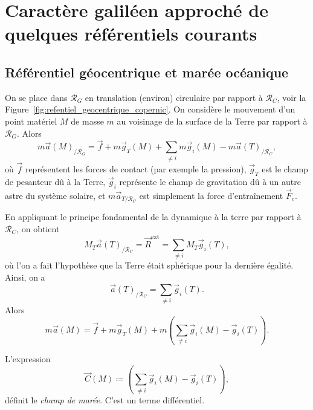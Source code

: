 \section[Caractère galiléen de certains référentiels]{Caractère galiléen approché de quelques référentiels courants}

    \subsection{Référentiel géocentrique et marée océanique}

        On se place dans $\mathcal{R}_{G}$ en translation (environ) circulaire par rapport à $\mathcal{R}_{C}$, voir la Figure~\ref{fig:refentiel_geocentrique_copernic}. On considère le mouvement d'un point matériel $M$ de masse $m$ au voisinage de la surface de la Terre par rapport à $\mathcal{R}_{G}$. Alors 
        \begin{equation}
            m\vec{a}(M)_{/\mathcal{R}_{G}}=\vec{f}+m\vec{g}_{T}(M)+\sum_{\neq i}m\vec{g}_{i}(M)-m\vec{a}(T)_{/\mathcal{R}_C},
        \end{equation}
        où $\vec{f}$ représentent les forces de contact (par exemple la pression), $\vec{g}_{T}$ est le champ de pesanteur dû à la Terre, $\vec{g}_{i}$ représente le champ de gravitation dû à un autre astre du système solaire, et $m\vec{a}_{T/\mathcal{R}_{C}}$ est simplement la force d'entraînement $\vec{F}_{e}$.

        En appliquant le principe fondamental de la dynamique à la terre par rapport à $\mathcal{R}_{C}$, on obtient 
        \begin{equation}
            M_{T}\vec{a}(T)_{/\mathcal{R}_{C}}=\vec{R}^{\text{ext}}=\sum_{\neq i}M_T\vec{g}_i(T),
        \end{equation}
        où l'on a fait l'hypothèse que la Terre était sphérique pour la dernière égalité. Ainsi, on a 
        \begin{equation}
            \vec{a}(T)_{/\mathcal{R}_C}=\sum_{\neq i}\vec{g}_i(T).
        \end{equation}
        Alors 
        \begin{equation}
            \boxed{m\vec{a}(M)=\vec{f}+m\vec{g}_{T}(M)+m\left(\sum_{\neq i}\vec{g}_{i}(M)-\vec{g}_{i}(T)\right).}
        \end{equation}

        \begin{definition}
            L'expression
            \begin{equation}
                \vec{C}(M)\coloneqq\left(\sum_{\neq i}\vec{g}_{i}(M)-\vec{g}_{i}(T)\right),
            \end{equation}
            définit le \textit{champ de marée}. C'est un terme différentiel.
        \end{definition}

